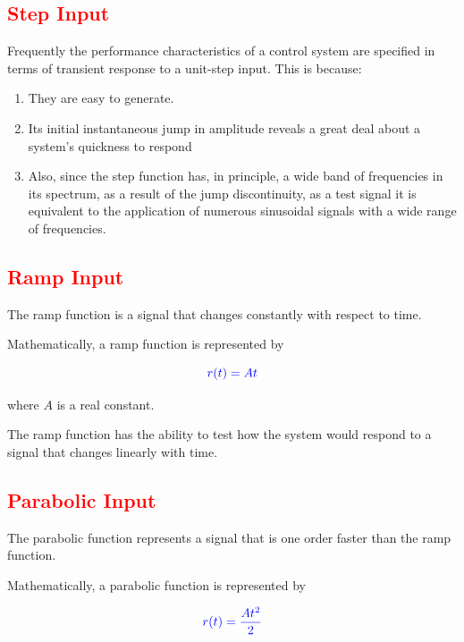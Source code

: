 \documentclass[
  14pt,
  a4paper,
  oneside,
  open=any,
  a4paper,
  14pt]{report}
\begin{document}
\subsection{\texorpdfstring{\textcolor{red}{Step
Input}}{Step Input}}\label{step-input}

Frequently the performance characteristics of a control system are
specified in terms of transient response to a unit-step input. This is
because:

\begin{enumerate}
\def\labelenumi{\arabic{enumi}.}
\item
  They are easy to generate.
\item
  Its initial instantaneous jump in amplitude reveals a great deal about
  a system's quickness to respond
\item
  Also, since the step function has, in principle, a wide band of
  frequencies in its spectrum, as a result of the jump discontinuity, as
  a test signal it is equivalent to the application of numerous
  sinusoidal signals with a wide range of frequencies.
\end{enumerate}

\subsection{\texorpdfstring{\textcolor{red}{Ramp
Input}}{Ramp Input}}\label{ramp-input}

The ramp function is a signal that changes constantly with respect to
time.

Mathematically, a ramp function is represented by

\[
    \textcolor{blue}{r(t) = At}
\]

where \(A\) is a real constant.

The ramp function has the ability to test how the system would respond
to a signal that changes linearly with time.

\subsection{\texorpdfstring{\textcolor{red}{Parabolic
Input}}{Parabolic Input}}\label{parabolic-input}

The parabolic function represents a signal that is one order faster than
the ramp function.

Mathematically, a parabolic function is represented by

\[
    \textcolor{blue}{r(t) = \dfrac{At^2}{2}}
\]
\end{document}
